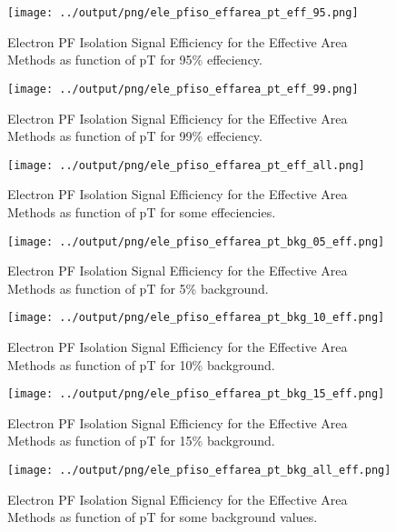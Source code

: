 \documentclass[11pt]{book}
\begin{document}
\begin{figure}[htb]
\centering
\texttt{[image: ../output/png/ele\_pfiso\_effarea\_pt\_eff\_95.png]}
\caption{Electron PF Isolation Signal Efficiency for the Effective Area Methods as function of pT for 95\% effeciency.}
\label{fig:ele_pfiso_pt_eff_effarea_eff_95}
\end{figure}

\begin{figure}[htb]
\centering
\texttt{[image: ../output/png/ele\_pfiso\_effarea\_pt\_eff\_99.png]}
\caption{Electron PF Isolation Signal Efficiency for the Effective Area Methods as function of pT for 99\% effeciency.}
\label{fig:ele_pfiso_pt_eff_effarea_eff_99}
\end{figure}

\begin{figure}[htb]
\centering
\texttt{[image: ../output/png/ele\_pfiso\_effarea\_pt\_eff\_all.png]}
\caption{Electron PF Isolation Signal Efficiency for the Effective Area Methods as function of pT for some effeciencies.}
\label{fig:ele_pfiso_pt_eff_effarea_eff_all}
\end{figure}

\begin{figure}[htb]
\centering
\texttt{[image: ../output/png/ele\_pfiso\_effarea\_pt\_bkg\_05\_eff.png]}
\caption{Electron PF Isolation Signal Efficiency for the Effective Area Methods as function of pT for 5\% background.}
\label{fig:ele_pfiso_pt_bkg_effarea_bkg_05_eff}
\end{figure}

\begin{figure}[htb]
\centering
\texttt{[image: ../output/png/ele\_pfiso\_effarea\_pt\_bkg\_10\_eff.png]}
\caption{Electron PF Isolation Signal Efficiency for the Effective Area Methods as function of pT for 10\% background.}
\label{fig:ele_pfiso_pt_bkg_effarea_bkg_10_eff}
\end{figure}

\begin{figure}[htb]
\centering
\texttt{[image: ../output/png/ele\_pfiso\_effarea\_pt\_bkg\_15\_eff.png]}
\caption{Electron PF Isolation Signal Efficiency for the Effective Area Methods as function of pT for 15\% background.}
\label{fig:ele_pfiso_pt_bkg_effarea_bkg_15_eff}
\end{figure}

\begin{figure}[htb]
\centering
\texttt{[image: ../output/png/ele\_pfiso\_effarea\_pt\_bkg\_all\_eff.png]}
\caption{Electron PF Isolation Signal Efficiency for the Effective Area Methods as function of pT for some background values.}
\label{fig:ele_pfiso_pt_bkg_effarea_bkg_all_eff}
\end{figure}
\clearpage
\end{document}
